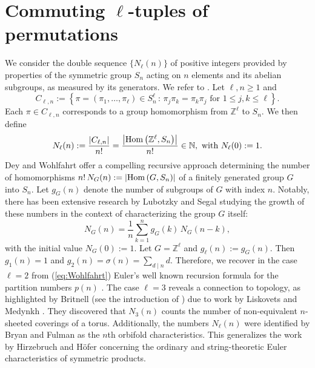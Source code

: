 \documentclass[11pt,reqno]{amsart}
\theoremstyle{plain}
\theoremstyle{remark}
\theoremstyle{definition}
\numberwithin{equation}{section}
\def\func#1{\mathop{\rm #1}}%
\begin{document}
\section{Commuting $\ell$-tuples of
permutations}
We consider the double sequence $\{N_{\ell}(n)\}$ of positive integers
provided by properties of the symmetric group $S_n$ acting
on $n$ elements and its abelian subgroups,
as measured
by its generators. We refer to
\cite{Ab24,ABDV24}.
Let $\ell,n  \geq 1$ and 
\begin{equation*}
C_{\ell,n}:= \left\{ \pi=(\pi_1, \ldots, \pi_{\ell}) \in S_n^{\ell}\, : \,
\pi_j \pi_k = \pi_k \pi_j \text{ for } 1 \leq j,k \leq \ell \right\}
.
\end{equation*}
Each
$\pi \in C_{\ell,n}$ corresponds to a group homomorphism from
$\mathbb{Z}^{\ell} $ to $S_n$. We
then define
\begin{equation*}
N_{\ell}(n):= \frac{\vert C_{\ell,n} \vert}{n!} 
=
\frac{\left\vert 
\func{Hom}\left( \mathbb{Z}^{\ell},S_n\right) \right\vert
}{n!}  \in \mathbb{N}, \text{ with }  N_{\ell}(0):=1.
\end{equation*}
Dey \cite{De65} and Wohlfahrt \cite{Wo77}
offer a compelling
recursive approach
determining
the number of homomorphisms $n! \, N_G(n):=  \left\vert \func{Hom}\left( G,S_n\right) \right\vert$ 
of a finitely generated group $G$ into $S_n$. Let $g_G(n)$ denote the
number of subgroups of $G$
with index $n$.
Notably, there has been
extensive research
by Lubotzky and Segal \cite{LS03}
studying the growth of these numbers in
the context of
characterizing the group $G$ itself:
\begin{equation} 
\label{eq:Wohlfahrt}
N_G(n) = \frac{1}{n} \sum_{k=1}^n g_G(k) \, N_G(n-k), 
\end{equation}
with the
initial value $N_G(0):=1$. 
Let $G=\mathbb{Z}^{\ell}$
and $g_{\ell}(n):= g_G(n)$. Then $g_1(n)=1$ and $g_2(n) = \sigma(n) = \sum_{d
\mid n} d$.
Therefore, we recover in the case $\ell=2$ from (\ref{eq:Wohlfahrt})  Euler's
well known recursion formula for the partition numbers $p(n)$ \cite{An98, On04}.
The case $\ell =3$ reveals a connection to topology,
as highlighted by Britnell (see the introduction of \cite{Br13}) due to work by
Liskovets and Medynkh \cite{LM09}. They discovered that  
$N_{3}(n)$ counts the number
of non-equivalent $n$-sheeted coverings of a torus.
Additionally, 
the numbers $N_{\ell}(n)$ were
identified by Bryan and Fulman \cite{BF98}
as the $n$th orbifold characteristics. This generalizes
the work by
Hirzebruch and H\"ofer \cite{HH90} concerning the ordinary
and string-theoretic Euler characteristics of symmetric products.
\end{document}
